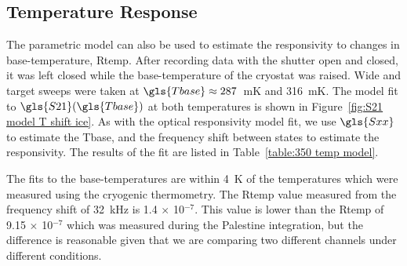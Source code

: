 
\subsection{Temperature Response}

The parametric model can also be used to estimate the responsivity to changes in base-temperature, \gls{Rtemp}. After recording data with the shutter open and closed, it was left closed while the base-temperature of the cryostat was raised. Wide and target sweeps were taken at $\gls{Tbase} \approx 287$~mK and 316~mK. The model fit to $\gls{S21}(\gls{Tbase})$ at both temperatures is shown in Figure~\ref{fig:S21 model T shift ice}. As with the optical responsivity model fit, we use $\gls{Sxx}$ to estimate the \gls{Tbase}, and the frequency shift between states to estimate the responsivity. The results of the fit are listed in Table~\ref{table:350 temp model}.

The fits to the base-temperatures are within 4~K of the temperatures which were measured using the cryogenic thermometry. The \gls{Rtemp} value measured from the frequency shift of 32~kHz is 1.4 $\times$ 10$^{-7}$. This value is lower than the \gls{Rtemp} of 9.15 $\times$ 10$^{-7}$ which was measured during the Palestine integration, but the difference is reasonable given that we are comparing two different channels under different conditions.

